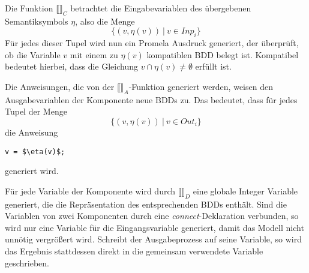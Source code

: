 Die Funktion $\llbracket\rrbracket_C$ betrachtet die Eingabevariablen des übergebenen Semantiksymbols $\eta$, also die Menge
\[ \{ (v,\eta(v))\ |\ v\in \mathit{Inp}_i \} \]
Für jedes dieser Tupel wird nun ein Promela Ausdruck generiert, der überprüft, ob die Variable $v$ mit einem zu $\eta(v)$ kompatiblen BDD belegt ist.
Kompatibel bedeutet hierbei, dass die Gleichung $v\cap\eta(v)\neq \emptyset$ erfüllt ist.

Die Anweisungen, die von der $\llbracket\rrbracket_A$-Funktion generiert werden, weisen den Ausgabevariablen der Komponente neue BDDs zu.
Das bedeutet, dass für jedes Tupel der Menge
\[ \{ (v,\eta(v))\ |\ v\in \mathit{Out}_i \} \]
die Anweisung
\begin{lstlisting}[language=promela,mathescape=true]
  v = $\eta(v)$;
\end{lstlisting}
generiert wird.

Für jede Variable der Komponente wird durch $\llbracket\rrbracket_D$ eine globale Integer Variable generiert, die die Repräsentation des entsprechenden BDDs enthält.
Sind die Variablen von zwei Komponenten durch eine \emph{connect}-Deklaration verbunden, so wird nur eine Variable für die Eingangsvariable generiert, damit das Modell nicht unnötig vergrößert wird.
Schreibt der Ausgabeprozess auf seine Variable, so wird das Ergebnis stattdessen direkt in die gemeinsam verwendete Variable geschrieben.